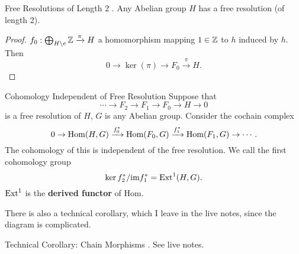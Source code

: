 \documentclass{article}
\begin{document}
\begin{Lemma}{Free Resolutions of Length 2}
.  Any Abelian group $H$ has a free resolution (of length 2).
\end{Lemma}

\begin{proof}
  $f_0 : \bigoplus_{H\setminus e}\mathbb{Z} \xrightarrow{\pi} H$ a homomorphism mapping $1 \in \mathbb{Z}$ to $h$ induced by $h$. Then
  \begin{equation}
    0 \rightarrow \ker(\pi) \rightarrow F_0 \xrightarrow{\pi} H.
  \end{equation}
\end{proof}

\begin{Corollary}{Cohomology Independent of Free Resolution}
  Suppose that
  \begin{equation}
    \cdots \rightarrow F_2 \rightarrow F_1 \rightarrow F_0 \rightarrow H \rightarrow 0
  \end{equation}
  is a free resolution of $H$, $G$ is any Abelian group. Consider the cochain complex
  \begin{equation}
    0 \rightarrow  \text{\normalfont Hom}(H, G) \xrightarrow{f_0^{*}}\text{\normalfont Hom}(F_0, G) \xrightarrow{f_1^{*}} \text{\normalfont Hom}(F_1, G) \rightarrow \cdots.
  \end{equation}
  The cohomology of this is independent of the free resolution. We call the first cohomology group
  \begin{equation}
    \ker f_2^{*} / \text{im} f_1^{*} = \text{\normalfont Ext}^1(H, G).
  \end{equation}
  $\text{\normalfont Ext}^1$ is the \textbf{derived functor} of Hom.
\end{Corollary}

There is also a technical corollary, which I leave in the live notes, since the diagram is complicated.

\begin{Corollary}{Technical Corollary: Chain Morphisms}
.  See live notes.
\end{Corollary}

\printindex
\end{document}
